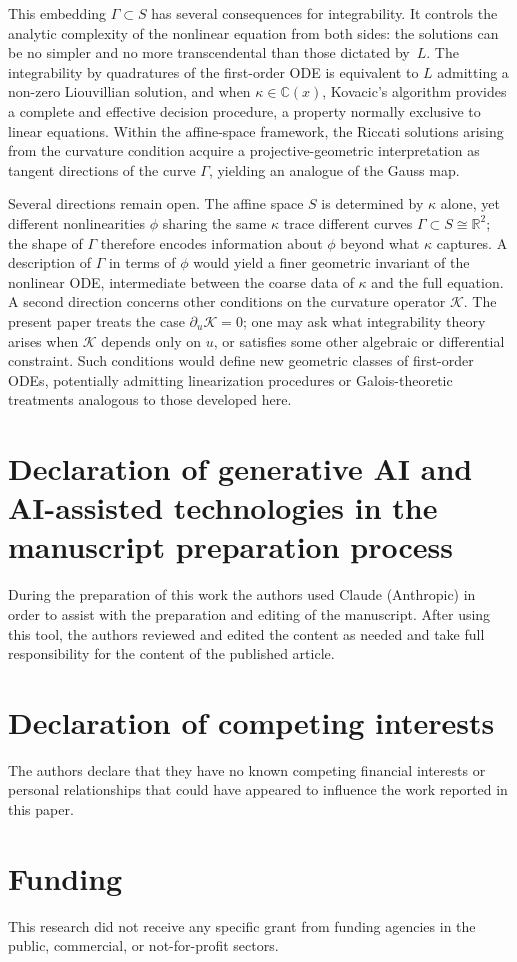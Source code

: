 \documentclass[preprint,a4paper]{elsarticle}
\begin{document}
This embedding $\Gamma\subset S$ has several consequences for integrability. It controls the analytic complexity of the nonlinear equation from both sides: the solutions can be no simpler and no more transcendental than those dictated by~$L$. The integrability by quadratures of the first-order ODE is equivalent to $L$ admitting a non-zero Liouvillian solution, and when $\kappa\in\mathbb{C}(x)$, Kovacic's algorithm provides a complete and effective decision procedure, a property normally exclusive to linear equations. Within the affine-space framework, the Riccati solutions arising from the curvature condition acquire a projective-geometric interpretation as tangent directions of the curve $\Gamma$, yielding an analogue of the Gauss map.

Several directions remain open. The affine space $S$ is determined by $\kappa$ alone, yet different nonlinearities $\phi$ sharing the same $\kappa$ trace different curves $\Gamma\subset S\cong\mathbb{R}^2$; the shape of $\Gamma$ therefore encodes information about $\phi$ beyond what $\kappa$ captures. A description of $\Gamma$ in terms of $\phi$ would yield a finer geometric invariant of the nonlinear ODE, intermediate between the coarse data of $\kappa$ and the full equation. A second direction concerns other conditions on the curvature operator $\mathcal{K}$. The present paper treats the case $\partial_u\mathcal{K}=0$; one may ask what integrability theory arises when $\mathcal{K}$ depends only on $u$, or satisfies some other algebraic or differential constraint. Such conditions would define new geometric classes of first-order ODEs, potentially admitting linearization procedures or Galois-theoretic treatments analogous to those developed here.


\section*{Declaration of generative AI and AI-assisted technologies in the manuscript preparation process}

During the preparation of this work the authors used Claude (Anthropic) in order to assist with the preparation and editing of the manuscript. After using this tool, the authors reviewed and edited the content as needed and take full responsibility for the content of the published article.

\section*{Declaration of competing interests}

The authors declare that they have no known competing financial interests or personal relationships that could have appeared to influence the work reported in this paper.

\section*{Funding}

This research did not receive any specific grant from funding agencies in the public, commercial, or not-for-profit sectors.



\end{document}
